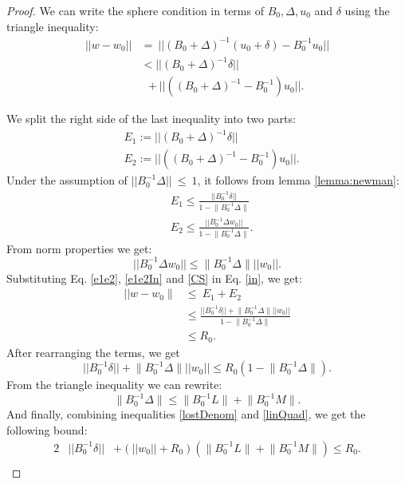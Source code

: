 \begin{proof}
We can write the sphere condition in terms of $B_0, \Delta, u_0$ and $\delta$ using the triangle
inequality:
\begin{equation} \label{in}
\begin{split}
||w-w_0|| & = \ ||(B_0+\Delta)^{-1}(u_0+\delta) - B_0^{-1}u_0|| \\
& < ||(B_0+\Delta)^{-1}\delta|| \\
& \ \ + ||((B_0+\Delta)^{-1} - B_0^{-1})u_0||.
\end{split}
\end{equation}

We split the right side of the last inequality into two parts:
\begin{equation}  \label{e1e2}
\begin{split}
& E_1:= ||(B_0+\Delta)^{-1}\delta|| \\
& E_2:= ||((B_0+\Delta)^{-1} - B_0^{-1})u_0||.
\end{split}
\end{equation}
Under the assumption of $||B_0^{-1}\Delta||\ \leq \ 1$,
it follows from lemma \ref{lemma:newman}:
\begin{equation} \label{e1e2In}
\begin{split}
& E_1 \leq \frac{||B_0^{-1}\delta||}{1-\Big \|B_0^{-1}\Delta\Big \|} \\
& E_2 \leq  \frac{|| B_0^{-1}\Delta w_0||}{1-\Big \|B_0^{-1}\Delta\Big \|}.
\end{split}
\end{equation}
From norm properties we get:
\begin{equation} \label{CS}
||B_0^{-1}\Delta w_0||  \leq  \Big \|B_0^{-1}\Delta \Big \| ||w_0||.
\end{equation}
Substituting Eq. \ref{e1e2}, \ref{e1e2In} and \ref{CS} in Eq. \ref{in}, we
get:
\begin{equation}
\begin{split}
|| w-w_0 \parallel & \leq \ E_1+E_2 \\
& \leq \frac{||B_0^{-1}\delta|| + \Big \|B_0^{-1}\Delta\Big \|||w_0||}{1 -\Big \|B_0^{-1}\Delta \Big \|} \\
& \leq R_0.
\end{split}
\end{equation}
After rearranging the terms, we get
\begin{equation} \label{lostDenom}
||B_0^{-1}\delta|| + \Big \|B_0^{-1}\Delta \Big \| ||w_0||
\leq R_0(1 -\Big \|B_0^{-1}\Delta\Big \|).
\end{equation}
From the triangle inequality we can rewrite:
\begin{equation} \label{linQuad}
\Big \|B_0^{-1}\Delta\Big \| \leq \Big \|B_0^{-1}L\Big \|+\Big \|B_0^{-1}M\Big \|.
\end{equation}
And finally, combining inequalities \ref{lostDenom} and \ref{linQuad},
we get the following bound:
\begin{alignat*}{2} \label{convexBound}
&||B_0^{-1}\delta|| &+ (||w_0||+R_0)(\Big \|B_0^{-1}L\Big \|+\Big \|B_0^{-1}M\Big \|)  \leq R_0. \\
&
\end{alignat*}
\end{proof}

